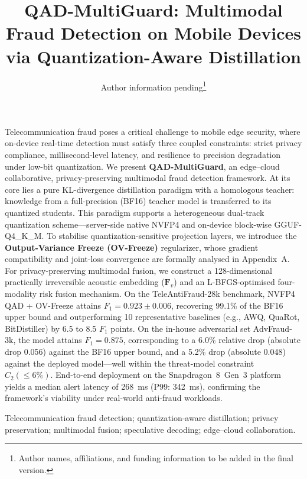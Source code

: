 \documentclass[11pt, a4paper]{article}
\title{\textbf{QAD-MultiGuard: Multimodal Fraud Detection on Mobile Devices via Quantization-Aware Distillation}}
\author{Author information pending\thanks{Author names, affiliations, and funding information to be added in the final version.}}
\date{}
\begin{document}
\maketitle
\thispagestyle{plain}

Telecommunication fraud poses a critical challenge to mobile edge security, where on-device real-time detection must satisfy three coupled constraints: strict privacy compliance, millisecond-level latency, and resilience to precision degradation under low-bit quantization. We present \textbf{QAD-MultiGuard}, an edge--cloud collaborative, privacy-preserving multimodal fraud detection framework. At its core lies a pure KL-divergence distillation paradigm with a homologous teacher: knowledge from a full-precision (BF16) teacher model is transferred to its quantized students. This paradigm supports a heterogeneous dual-track quantization scheme---server-side native NVFP4 and on-device block-wise GGUF-Q4\_K\_M. To stabilise quantization-sensitive projection layers, we introduce the \textbf{Output-Variance Freeze (OV-Freeze)} regularizer, whose gradient compatibility and joint-loss convergence are formally analysed in Appendix~A. For privacy-preserving multimodal fusion, we construct a 128-dimensional practically irreversible acoustic embedding ($\bm{F}_v$) and an L-BFGS-optimised four-modality risk fusion mechanism. On the TeleAntiFraud-28k benchmark, NVFP4 QAD + OV-Freeze attains $F_1 = 0.923 \pm 0.006$, recovering 99.1\% of the BF16 upper bound and outperforming 10 representative baselines (e.g., AWQ, QuaRot, BitDistiller) by 6.5 to 8.5 $F_1$ points. On the in-house adversarial set AdvFraud-3k, the model attains $F_1 = 0.875$, corresponding to a 6.0\% relative drop (absolute drop 0.056) against the BF16 upper bound, and a 5.2\% drop (absolute 0.048) against the deployed model---well within the threat-model constraint $C_2(\le 6\%)$. End-to-end deployment on the Snapdragon~8~Gen~3 platform yields a median alert latency of 268~ms (P99: 342~ms), confirming the framework's viability under real-world anti-fraud workloads.

\vspace{0.5em}
 Telecommunication fraud detection; quantization-aware distillation; privacy preservation; multimodal fusion; speculative decoding; edge--cloud collaboration.
\end{document}
